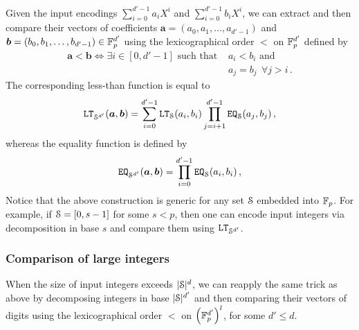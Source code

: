   Given the input encodings $\sum_{i=0}^{d'-1} a_i X^i$ and $\sum_{i=0}^{d'-1} b_i X^i$, we can extract and then compare their vectors of coefficients $\bm{a} = (a_0,a_1,\ldots,a_{d'-1})$ and $\bm{b} = (b_0,b_1,\ldots,b_{d'-1}) \in \F_p^{d'}$ using the lexicographical order $\bm{<}$ on $\F_{p}^{d'}$ defined by
   \begin{align*}
      \bm{a} \bm{<} \bm{b} \Leftrightarrow \exists i\in[0,d'-1] \text{ such that } & a_i < b_i \text{ and } \\
       & a_j = b_j ~~ \forall j > i \,.
    \end{align*}
    The corresponding less-than function is equal to
    \begin{align*}
      \LT_{\S^{d'}}(\bm{a}, \bm{b}) = \sum_{i=0}^{d'-1} \LT_{\S}(a_{i}, b_{i}) \prod_{j=i+1}^{d'-1} \EQ_{\S}(a_{j}, b_{j})\,,
    \end{align*}
    whereas the equality function is defined by
    \begin{align*}
      \EQ_{\S^{d'}}(\bm{a}, \bm{b}) = \prod_{i=0}^{d'-1} \EQ_{\S}(a_{i}, b_{i})\,,
    \end{align*}
    Notice that the above construction is generic for any set $\S$ embedded into $\F_p$.
    For example, if $\S = [0,s-1]$ for some $s < p$, then one can encode input integers via decomposition in base $s$ and compare them using $\LT_{\S^{d'}}$.

\subsubsection{Comparison of large integers}\label{sec:comparison_of_large_integers}
When the size of input integers exceeds $|\S|^d$, we can reapply the same trick as above by decomposing integers in base $|\S|^{d'}$ and then comparing their vectors of digits using the lexicographical order $\bm{<}$ on $\left(\F_{p}^{d'}\right)^l$, for some $d' \le d$.

